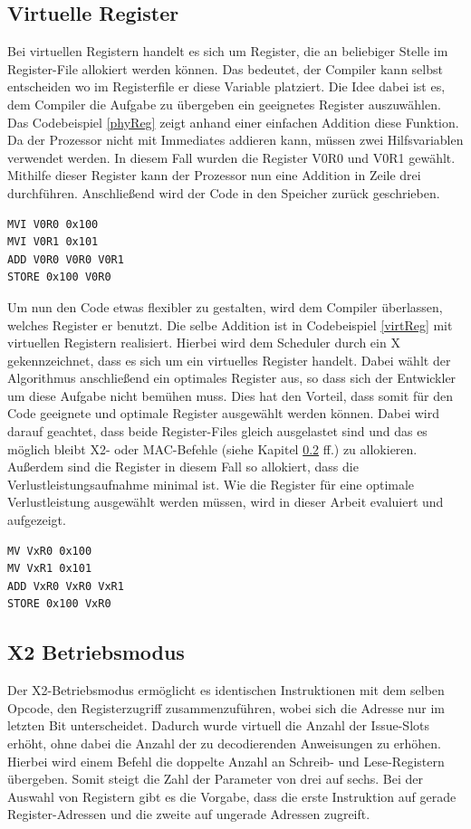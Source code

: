 \subsection{Virtuelle Register}
\label{sub:virtuelleR}
Bei virtuellen Registern handelt es sich um Register, die an beliebiger Stelle im Register-File allokiert werden können. Das bedeutet, der Compiler kann selbst entscheiden wo im Registerfile er diese Variable platziert. 
Die Idee dabei ist es, dem Compiler die Aufgabe zu übergeben ein geeignetes Register auszuwählen. Das Codebeispiel \ref{phyReg} zeigt anhand einer einfachen Addition diese Funktion. Da der Prozessor nicht mit Immediates addieren kann, müssen zwei Hilfsvariablen verwendet werden. In diesem Fall wurden die Register V0R0 und V0R1 gewählt. Mithilfe dieser Register kann der Prozessor nun eine Addition in Zeile drei durchführen. Anschließend wird der Code in den Speicher zurück geschrieben.
\renewcommand{\lstlistingname}{Codebeispiel}
\begin{lstlisting}[frame=single, caption={physikalische Register},captionpos=b,label=phyReg]
MVI V0R0 0x100
MVI V0R1 0x101
ADD V0R0 V0R0 V0R1
STORE 0x100 V0R0
\end{lstlisting}
\newpage
Um nun den Code etwas flexibler zu gestalten, wird dem Compiler überlassen, welches Register er benutzt. Die selbe Addition ist in Codebeispiel \ref{virtReg} mit virtuellen Registern realisiert. Hierbei wird dem Scheduler durch ein X gekennzeichnet, dass es sich um ein virtuelles Register handelt. Dabei wählt der Algorithmus anschließend ein optimales Register aus, so dass sich der Entwickler um diese Aufgabe nicht bemühen muss. Dies hat den Vorteil, dass somit für den Code geeignete und optimale Register ausgewählt werden können. Dabei wird darauf geachtet, dass beide Register-Files gleich ausgelastet sind und das es möglich bleibt X2- oder MAC-Befehle (siehe Kapitel \ref{subsec:x2Mode} ff.) zu allokieren. Außerdem sind die Register in diesem Fall so allokiert, dass die Verlustleistungsaufnahme minimal ist. Wie die Register für eine optimale Verlustleistung ausgewählt werden müssen, wird in dieser Arbeit evaluiert und aufgezeigt.

\begin{lstlisting}[frame=single,caption={virtuelle Register},captionpos=b,label=virtReg]
MV VxR0 0x100
MV VxR1 0x101
ADD VxR0 VxR0 VxR1
STORE 0x100 VxR0
\end{lstlisting}
\subsection{X2 Betriebsmodus}\label{subsec:x2Mode}
Der X2-Betriebsmodus ermöglicht es identischen Instruktionen mit dem selben Opcode, den Registerzugriff zusammenzuführen, wobei sich die Adresse nur im letzten Bit unterscheidet. Dadurch wurde virtuell die Anzahl der Issue-Slots erhöht, ohne dabei die Anzahl der zu decodierenden Anweisungen zu erhöhen. Hierbei wird einem Befehl die doppelte Anzahl an Schreib- und Lese-Registern übergeben. Somit steigt die Zahl der Parameter von drei auf sechs. Bei der Auswahl von Registern gibt es die Vorgabe, dass die erste Instruktion auf gerade Register-Adressen und die zweite auf ungerade Adressen zugreift. \cite{paya2009instruction}
